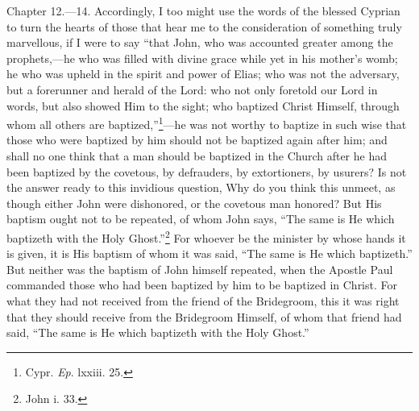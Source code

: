 Chapter 12.—14. Accordingly, I too might use the words of the blessed Cyprian to turn the hearts of those that hear me to the consideration of something truly marvellous, if I were to say ``that John, who was accounted greater among the prophets,—he who was filled with divine grace while yet in his mother’s womb; he who was upheld in the spirit and power of Elias; who was not the adversary, but a forerunner and herald of the Lord: who not only foretold our Lord in words, but also showed Him to the sight; who baptized Christ Himself, through whom all others are baptized,''\footnote{\par  Cypr. \emph{Ep}. lxxiii. 25.}—he was not worthy to baptize in such wise that those who were baptized by him should not be baptized again after him; and shall no one think that a man should be baptized in the Church after he had been baptized by the covetous, by defrauders, by extortioners, by usurers? Is not the answer ready to this invidious question, Why do you think this unmeet, as though either John were dishonored, or the covetous man honored? But His baptism ought not to be repeated, of whom John says, ``The same is He which baptizeth with the Holy Ghost.''\footnote{\par  John i. 33.} For whoever be the minister by whose hands it is given, it is His baptism of whom it was said, ``The same is He which baptizeth.'' But neither was the baptism of John himself repeated, when the Apostle Paul commanded those who had been baptized by him to be baptized in Christ. For what they had not received from the friend of the Bridegroom, this it was right that they should receive from the Bridegroom Himself, of whom that friend had said, ``The same is He which baptizeth with the Holy Ghost.''


